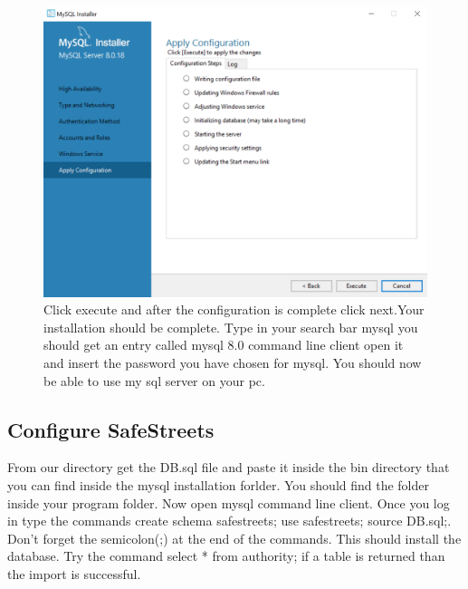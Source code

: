 \begin{figure}[h]
\centering
\includegraphics[width=\textwidth]{Images/7-mysql.png}
\caption{\label{fig:fmy} Click execute and after the configuration is complete click next.Your installation should be complete.
Type in your search bar mysql you should get an entry called mysql 8.0 command line client open it and insert the password you have chosen for mysql. You should now be able to use my sql server on your pc.}
\end{figure}


\clearpage
\subsection{Configure SafeStreets}
From our directory get the DB.sql file and paste it inside the bin directory that you can find inside the mysql installation forlder.
You should find the folder inside your program folder.
Now open mysql command line client. Once you log in type the commands  
\newline 
\newline create schema safestreets;
\newline use safestreets; 
\newline source DB.sql;.
\newline
\newline 
Don't forget the semicolon(;) at the end of the commands.
This should install the database. Try the command \newline select * from authority;  
\newline if a table is returned than the import is successful.

